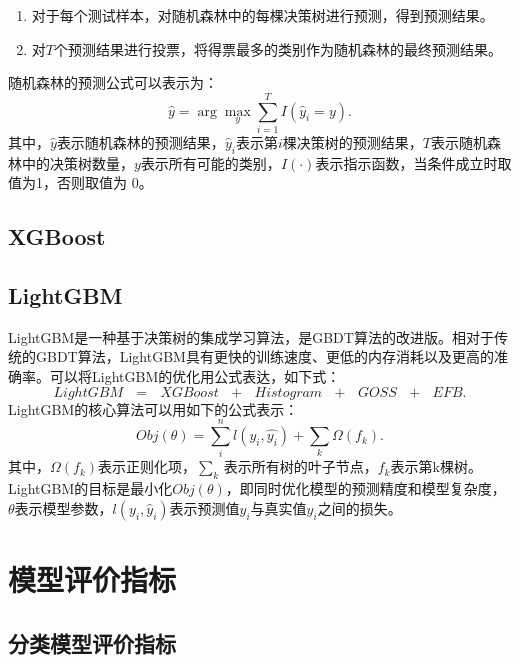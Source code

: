 \documentclass[UTF8,12pt]{ctexart}
\begin{document}
	\begin{enumerate}
		\item 对于每个测试样本，对随机森林中的每棵决策树进行预测，得到预测结果。
		\item 对$T$个预测结果进行投票，将得票最多的类别作为随机森林的最终预测结果。
	\end{enumerate}
	
	随机森林的预测公式可以表示为：
	\begin{equation}
		\widehat{y}=\arg {{\max }_{y}}\sum\limits_{i=1}^{T}{I\left( {{\widehat{y}}_{i}}=y \right)}.
	\end{equation}
	其中，$\widehat{y}$表示随机森林的预测结果，${{\widehat{y}}_{i}}$表示第$i$棵决策树的预测结果，$T$表示随机森林中的决策树数量，$y$表示所有可能的类别，$I(\cdot )$表示指示函数，当条件成立时取值为1，否则取值为 0。
	
	\subsection{XGBoost}
	
	\subsection{LightGBM}
	
	LightGBM是一种基于决策树的集成学习算法，是GBDT算法的改进版。相对于传统的GBDT算法，LightGBM具有更快的训练速度、更低的内存消耗以及更高的准确率。可以将LightGBM的优化用公式表达，如下式：
	\begin{equation}
		LightGBM\text{ }=\text{ }XGBoost\text{ }+\text{ }Histogram\text{ }+\text{ }GOSS\text{ }+\text{ }EFB.
	\end{equation}
	LightGBM的核心算法可以用如下的公式表示：
	\begin{equation}
		Obj(\theta )=\sum\limits_{i}^{n}{l({{y}_{i}},\widehat{{{y}_{i}}})}+\sum\limits_{k}{\Omega }({{f}_{k}}). 
	\end{equation}
	其中，$\Omega ({{f}_{k}})$表示正则化项，$\underset{k}{\mathop{\sum }}\,$表示所有树的叶子节点，${{f}_{k}}$表示第k棵树。LightGBM的目标是最小化$Obj(\theta )$，即同时优化模型的预测精度和模型复杂度，$\theta$表示模型参数，$l\left( {{y}_{i}},{{\widehat{y}}_{i}} \right)$表示预测值${{\widehat{y}}_{i}}$与真实值${{y}_{i}}$之间的损失。
	
	\section{模型评价指标}
	
	\subsection{分类模型评价指标}
	
\end{document}
